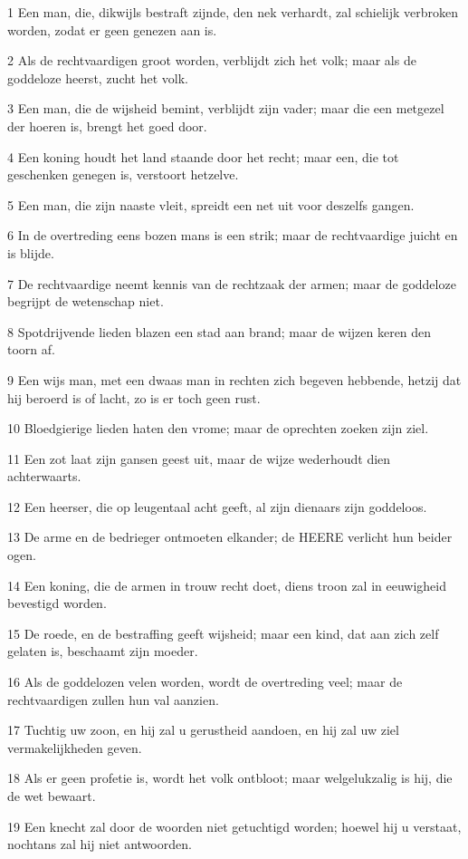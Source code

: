\par 1 Een man, die, dikwijls bestraft zijnde, den nek verhardt, zal schielijk verbroken worden, zodat er geen genezen aan is.
\par 2 Als de rechtvaardigen groot worden, verblijdt zich het volk; maar als de goddeloze heerst, zucht het volk.
\par 3 Een man, die de wijsheid bemint, verblijdt zijn vader; maar die een metgezel der hoeren is, brengt het goed door.
\par 4 Een koning houdt het land staande door het recht; maar een, die tot geschenken genegen is, verstoort hetzelve.
\par 5 Een man, die zijn naaste vleit, spreidt een net uit voor deszelfs gangen.
\par 6 In de overtreding eens bozen mans is een strik; maar de rechtvaardige juicht en is blijde.
\par 7 De rechtvaardige neemt kennis van de rechtzaak der armen; maar de goddeloze begrijpt de wetenschap niet.
\par 8 Spotdrijvende lieden blazen een stad aan brand; maar de wijzen keren den toorn af.
\par 9 Een wijs man, met een dwaas man in rechten zich begeven hebbende, hetzij dat hij beroerd is of lacht, zo is er toch geen rust.
\par 10 Bloedgierige lieden haten den vrome; maar de oprechten zoeken zijn ziel.
\par 11 Een zot laat zijn gansen geest uit, maar de wijze wederhoudt dien achterwaarts.
\par 12 Een heerser, die op leugentaal acht geeft, al zijn dienaars zijn goddeloos.
\par 13 De arme en de bedrieger ontmoeten elkander; de HEERE verlicht hun beider ogen.
\par 14 Een koning, die de armen in trouw recht doet, diens troon zal in eeuwigheid bevestigd worden.
\par 15 De roede, en de bestraffing geeft wijsheid; maar een kind, dat aan zich zelf gelaten is, beschaamt zijn moeder.
\par 16 Als de goddelozen velen worden, wordt de overtreding veel; maar de rechtvaardigen zullen hun val aanzien.
\par 17 Tuchtig uw zoon, en hij zal u gerustheid aandoen, en hij zal uw ziel vermakelijkheden geven.
\par 18 Als er geen profetie is, wordt het volk ontbloot; maar welgelukzalig is hij, die de wet bewaart.
\par 19 Een knecht zal door de woorden niet getuchtigd worden; hoewel hij u verstaat, nochtans zal hij niet antwoorden.
